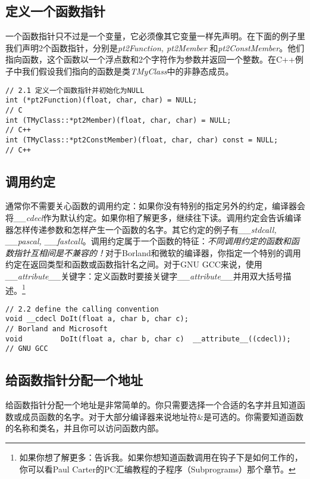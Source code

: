 \documentclass[11pt,a4paper]{article}
\begin{document}
\subsection{定义一个函数指针}
一个函数指针只不过是一个变量，它必须像其它变量一样先声明。在下面的例子里我们声明2个函数指针，分别是\textit{pt2Function, pt2Member} 和\textit{pt2ConstMember}。他们指向函数，这个函数以一个浮点数和2个字符作为参数并返回一个整数。在C++例子中我们假设我们指向的函数是类\textit{TMyClass}中的非静态成员。

\begin{lstlisting}
// 2.1 定义一个函数指针并初始化为NULL
int (*pt2Function)(float, char, char) = NULL;                        // C
int (TMyClass::*pt2Member)(float, char, char) = NULL;                // C++
int (TMyClass::*pt2ConstMember)(float, char, char) const = NULL;     // C++
\end{lstlisting}

\subsection{调用约定}
通常你不需要关心函数的调用约定：如果你没有特别的指定另外的约定，编译器会将\textit{\_\_cdecl}作为默认约定。如果你相了解更多，继续往下读。调用约定会告诉编译器怎样传递参数和怎样产生一个函数的名字。其它约定的例子有\textit{\_\_stdcall, \_\_pascal, \_\_fastcall}。调用约定属于一个函数的特征：\emph{不同调用约定的函数和函数指针互相间是不兼容的！}对于Borland和微软的编译器，你指定一个特别的调用约定在返回类型和函数或函数指针名之间。对于GNU GCC来说，使用\textit{\_\_attribute\_\_}关键字：定义函数时要接关键字\textit{\_\_attribute\_\_}并用双大括号描述。\footnote{如果你想了解更多：告诉我。如果你想知道函数调用在钩子下是如何工作的，你可以看Paul Carter的PC汇编教程的子程序（Subprograms）那个章节。}
\begin{lstlisting}
// 2.2 define the calling convention
void __cdecl DoIt(float a, char b, char c);                             // Borland and Microsoft
void         DoIt(float a, char b, char c)  __attribute__((cdecl));     // GNU GCC
\end{lstlisting}
\subsection{给函数指针分配一个地址}
给函数指针分配一个地址是非常简单的。你只需要选择一个合适的名字并且知道函数或成员函数的名字。对于大部分编译器来说地址符\&是可选的。你需要知道函数的名称和类名，并且你可以访问函数内部。
\end{document}
